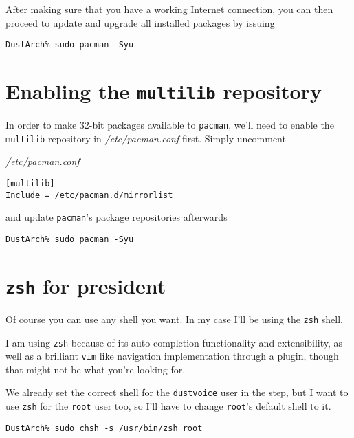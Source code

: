 \documentclass[10pt]{dustdoc}
\begin{document}
After making sure that you have a working Internet connection, you can then proceed to update and upgrade all installed packages by issuing

\begin{verbatim}
DustArch% sudo pacman -Syu
\end{verbatim}

\section{Enabling the \texttt{multilib} repository}
\label{sec:enabling-the-multilib-repository}

In order to make 32-bit packages available to \texttt{pacman}, we’ll need to enable the \texttt{multilib} repository in \textit{/etc/pacman.conf} first.
Simply uncomment

\begin{mintedlisting}
    \caption*{\textit{/etc/pacman.conf}}
    \begin{verbatim}
[multilib]
Include = /etc/pacman.d/mirrorlist
    \end{verbatim}
\end{mintedlisting}

\noindent
and update \texttt{pacman}'s package repositories afterwards

\begin{verbatim}
DustArch% sudo pacman -Syu
\end{verbatim}

\section{\texttt{zsh} for president}
\label{sec:zsh-for-president}

Of course you can use any shell you want.
In my case I’ll be using the \texttt{zsh} shell.

\begin{NOTE}
    I am using \texttt{zsh} because of its auto completion functionality and extensibility, as well as a brilliant \texttt{vim} like navigation implementation through a plugin, though that might not be what you’re looking for.
\end{NOTE}

We already set the correct shell for the \texttt{dustvoice} user in the  step, but I want to use \texttt{zsh} for the \texttt{root} user too, so I’ll have to change \texttt{root}'s default shell to it.

\begin{verbatim}
DustArch% sudo chsh -s /usr/bin/zsh root
\end{verbatim}
\end{document}
